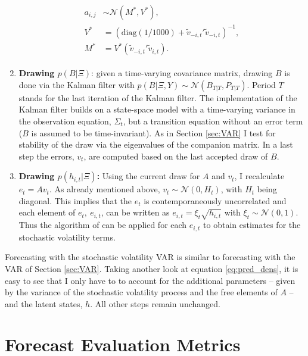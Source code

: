 \documentclass[12pt,letterpaper,fleqn]{article}           %
\begin{document}
\begin{enumerate}
\begin{align}
\begin{split}
a_{i,j} &\sim \mathcal{N}(M^*, V^*), \\
V^* &= (\mbox{diag}(1 / 1000) + \tilde{v}_{-i,t}'\tilde{v}_{-i,t})^{-1}, \\ 
M^* &= V^*(\tilde{v}_{-i,t}'\tilde{v}_{i,t}).
\end{split}
\end{align}

\item \textbf{Drawing $p(B|\Xi)$}: given a time-varying covariance matrix, drawing $B$ is done via the Kalman filter with $p(B|\Xi,Y) \sim \mathcal{N}(B_{T|T}, P_{T|T})$. Period $T$ stands for the last iteration of the Kalman filter. The implementation of the Kalman filter builds on a state-space model with a time-varying variance in the observation equation, $\Sigma_t$, but a transition equation without an error term ($B$ is assumed to be time-invariant). As in Section \ref{sec:VAR} I test for stability of the draw via the eigenvalues of the companion matrix. In a last step the errors, $v_t$, are computed based on the last accepted draw of $B$. \label{item:kalman}
\item \textbf{Drawing $p(h_{i,t}|\Xi)$:} Using the current draw for $A$ and $v_t$, I recalculate $e_t = Av_t$. As already mentioned above, $v_t \sim \mathcal{N}(0, H_t)$, with $H_t$ being diagonal. This implies that the $e_t$ is contemporaneously uncorrelated and each element of $e_t,\ e_{i,t}$, can be written as $e_{i,t} = \xi_t \sqrt{h_{i,t}}$ with $\xi_t \sim \mathcal{N}(0, 1)$. Thus the algorithm of \textcite{jac94} can be applied for each $e_{i,t}$ to obtain estimates for the stochastic volatility terms. 
\end{enumerate}

Forecasting with the stochastic volatility VAR is similar to forecasting with the VAR of Section \ref{sec:VAR}. Taking another look at equation \eqref{eq:pred_dens}, it is easy to see that I only have to to account for the additional parameters -- given by the variance of the stochastic volatility process and the free elements of $A$ -- and the latent states, $h$. All other steps remain unchanged. %




\section{Forecast Evaluation Metrics}
\label{sec:forecasts}
\end{document}

